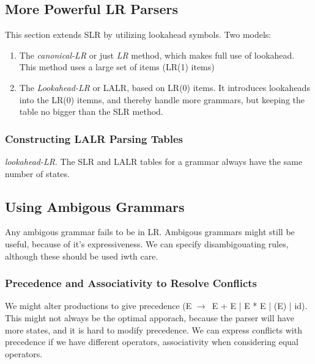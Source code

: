\documentclass{article}
\newcommand{\ta}{$\to$~}
\begin{document}

\subsection{More Powerful LR Parsers} %
\label{sub:More Powerful LR Parsers}
This section extends SLR by utilizing lookahead symbols. Two models:
\begin{enumerate}
	\item The \emph{canonical-LR} or just \emph{LR} method, which makes full use of lookahead. This method uses a large set of items (LR(1) items)
	\item The \emph{Lookahead-LR} or LALR, based on LR(0) items. It introduces lookaheads into the LR(0) itemns, and thereby handle more grammars, but keeping the table no bigger than the SLR method.
\end{enumerate}

\subsubsection{Constructing LALR Parsing Tables} %
\label{ssub:Constructing LALR Parsing Tables}
\emph{lookahead-LR}. The SLR and LALR tables for a grammar always have the same number of states. 


\subsection{Using Ambigous Grammars} %
\label{sub:Using Ambigous Grammars}
Any ambigous grammar fails to be in LR. Ambigous grammars might still be useful, because of it's expressiveness. We can specify disambigouating rules, although these should be used iwth care.

\subsubsection{Precedence and Associativity to Resolve Conflicts} %
\label{ssub:Precedence an dAssociativity to Resolve Conflicts}
We might alter productions to give precedence (E \ta E + E | E * E | (E) | id). This might not always be the optimal apporach, because the parser will have more states, and it is hard to modify precedence. We can express conflicts with precedence if we have different operators, associativity when considering equal operators.
\end{document}
